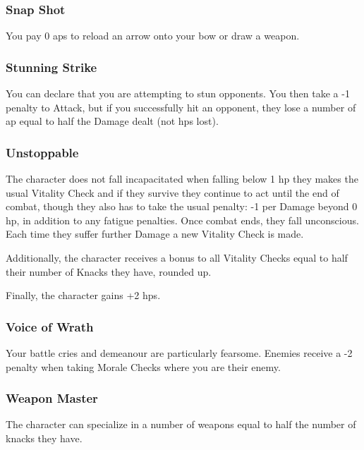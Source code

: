 \begin{multicols}{2}
\subsubsection{Snap Shot}

You pay 0 \glspl{ap} to reload an arrow onto your bow or draw a weapon.

\subsubsection{Stunning Strike}\label{stunningstrike}

You can declare that you are attempting to stun opponents.
You then take a -1 penalty to Attack, but if you successfully hit an opponent, they lose a number of \gls{ap} equal to half the Damage dealt (not \glspl{hp} lost).

\subsubsection{Unstoppable}

The character does not fall incapacitated when falling below 1 \gls{hp} they makes the usual Vitality Check and if they survive they continue to act until the end of combat, though they also has to take the usual penalty: -1 per Damage beyond 0 \gls{hp}, in addition to any \gls{fatigue} penalties.
Once combat ends, they fall unconscious.
Each time they suffer further Damage a new Vitality Check is made.

Additionally, the character receives a bonus to all Vitality Checks equal to half their number of Knacks they have, rounded up.

Finally, the character gains +2 \glspl{hp}.

\subsubsection{Voice of Wrath}

Your battle cries and demeanour are particularly fearsome. Enemies receive a -2 penalty when taking Morale Checks where you are their enemy.

\subsubsection{Weapon Master}

\iftoggle{verbose}{
  You have trained long and hard with a particular weapon, such as a longsword, spear, shortbow, or rocks.
  Gain +1 to your Combat or Projectiles Bonus when using that weapon.
  
}{
  Gain +1 to the Combat or Projectiles score when using a specialized weapon.
}%
  The character can specialize in a number of weapons equal to half the number of knacks they have.

\end{multicols}

